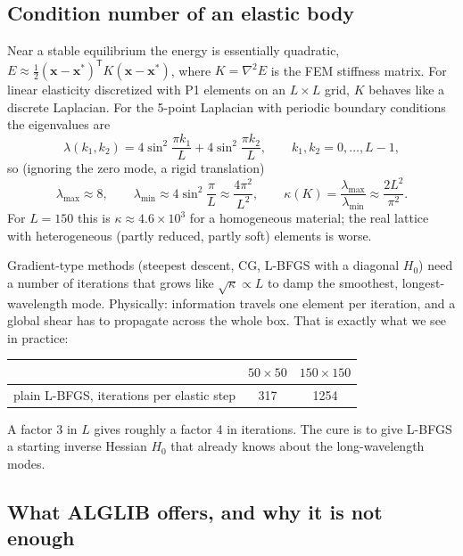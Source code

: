\documentclass[11pt,a4paper]{article}
\theoremstyle{remark}
\newcommand{\x}{\bm{x}}
\newcommand{\T}{^{\mathsf T}}
\begin{document}
\subsection{Condition number of an elastic body}

Near a stable equilibrium the energy is essentially quadratic,
$E\approx\tfrac12(\x-\x^*)\T K(\x-\x^*)$, where $K=\nabla^2E$ is the FEM stiffness matrix.
For linear elasticity discretized with P1 elements on an $L\times L$ grid, $K$ behaves like
a discrete Laplacian. For the 5-point Laplacian with periodic boundary conditions the
eigenvalues are
\begin{equation}
\lambda(k_1,k_2) = 4\sin^2\!\frac{\pi k_1}{L} + 4\sin^2\!\frac{\pi k_2}{L},
\qquad k_1,k_2 = 0,\dots,L-1,
\end{equation}
so (ignoring the zero mode, a rigid translation)
\begin{equation}
\lambda_{\max}\approx 8,\qquad \lambda_{\min}\approx 4\sin^2\frac{\pi}{L}\approx\frac{4\pi^2}{L^2},
\qquad
\kappa(K) = \frac{\lambda_{\max}}{\lambda_{\min}} \approx \frac{2L^2}{\pi^2}.
\end{equation}
For $L=150$ this is $\kappa\approx4.6\times10^3$ for a homogeneous material; the real lattice
with heterogeneous (partly reduced, partly soft) elements is worse.

Gradient-type methods (steepest descent, CG, L-BFGS with a diagonal $H_0$) need a number of
iterations that grows like $\sqrt{\kappa}\propto L$ to damp the smoothest, longest-wavelength
mode. Physically: information travels one element per iteration, and a global shear has to
propagate across the whole box. That is exactly what we see in practice:

\begin{center}
\begin{tabular}{lcc}
\toprule
& $50\times50$ & $150\times150$\\
\midrule
plain L-BFGS, iterations per elastic step & 317 & 1254 \\
\bottomrule
\end{tabular}
\end{center}

A factor 3 in $L$ gives roughly a factor 4 in iterations. The cure is to give L-BFGS a
starting inverse Hessian $H_0$ that already knows about the long-wavelength modes.

\subsection{What ALGLIB offers, and why it is not enough}
\end{document}
